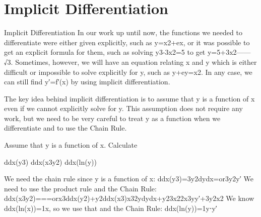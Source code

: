 \section{Implicit Differentiation}
\label{sec:implicit}

Implicit Differentiation
In our work up until now, the functions we needed to differentiate were either given explicitly, such as y=x2+ex, or it was possible to get an explicit formula for them, such as solving y3-3x2=5 to get y=5+3x2------√3. Sometimes, however, we will have an equation relating x and y which is either difficult or impossible to solve explicitly for y, such as y+ey=x2. In any case, we can still find y′=f′(x) by using implicit differentiation.

The key idea behind implicit differentiation is to assume that y is a function of x even if we cannot explicitly solve for y. This assumption does not require any work, but we need to be very careful to treat y as a function when we differentiate and to use the Chain Rule.

\begin{example}
Assume that y is a function of x. Calculate

ddx(y3)
ddx(x3y2)
ddx(ln(y))
\begin{solution} We need the chain rule since y is a function of x:
ddx(y3)=3y2dydx=or3y2y′
We need to use the product rule and the Chain Rule:
ddx(x3y2)===orx3ddx(y2)+y2ddx(x3)x32ydydx+y23x22x3yy′+3y2x2
We know ddx(ln(x))=1x, so we use that and the Chain Rule:
ddx(ln(y))=1y⋅y′
\end{solution}\end{example}

